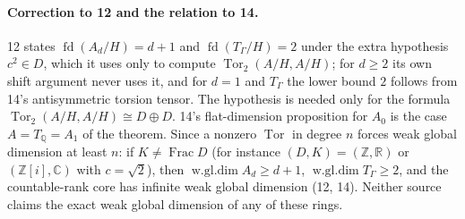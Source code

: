 \documentclass[11pt,letterpaper]{article}
\numberwithin{equation}{section}
\theoremstyle{definition}
\theoremstyle{remark}
\theoremstyle{plain}
\newcommand{\Z}{\mathbb Z}
\newcommand{\Q}{\mathbb Q}
\newcommand{\R}{\mathbb R}
\newcommand{\C}{\mathbb C}
\newcommand{\Frac}{\operatorname{Frac}}
\newcommand{\Tor}{\operatorname{Tor}}
\newcommand{\fd}{\operatorname{fd}}
\begin{document}
\paragraph{Correction to 12 and the relation to 14.} 12 states $\fd(A_d/H)=d+1$ and $\fd(T_\Gamma/H)=2$ under the extra
hypothesis $c^2\in D$, which it uses only to compute $\Tor_2(A/H,A/H)$; for $d\ge2$ its own shift argument never uses it,
and for $d=1$ and $T_\Gamma$ the lower bound $2$ follows from 14's antisymmetric torsion tensor. The hypothesis is needed only
for the formula $\Tor_2(A/H,A/H)\cong D\oplus D$. 14's flat-dimension proposition for $A_0$ is the case $A=T_\Q=A_1$ of the
theorem. Since a nonzero $\Tor$ in degree $n$ forces weak global dimension at least $n$: if $K\ne\Frac D$ (for instance
$(D,K)=(\Z,\R)$ or $(\Z[i],\C)$ with $c=\sqrt2$), then $\operatorname{w.gl.dim}A_d\ge d+1$,
$\operatorname{w.gl.dim}T_\Gamma\ge2$, and the countable-rank core has infinite weak global dimension (12, 14). Neither source
claims the exact weak global dimension of any of these rings.
\end{document}
